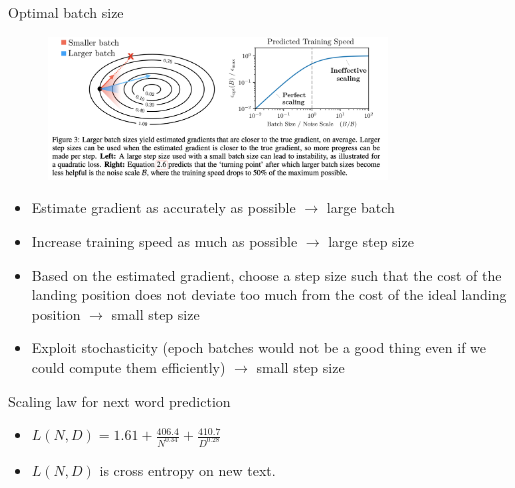 \begin{vbframe}{Optimal batch size}
\href{https://arxiv.org/pdf/1812.06162.pdf}{} 


\vfill

\begin{figure}
	\centering
	\includegraphics[width =9cm]{./figure/optimalbatchsize}
\end{figure}

\vfill

\begin{itemize}

	\item Estimate gradient as accurately as possible
        $\rightarrow$ large batch
        \item Increase training speed as much as possible
        $\rightarrow$ large step size
        \item Based on the estimated gradient, choose a step
        size such that the cost of the landing position does not deviate
        too much from the cost of the ideal landing position
        $\rightarrow$ small step size
        \item Exploit stochasticity (epoch batches would not
        be a good thing even if we could compute them efficiently)
        $\rightarrow$ small step size

\end{itemize}


\vfill

\end{vbframe}



\begin{vbframe}{Scaling law for next word prediction}

\vfill

\begin{itemize}


\item $L(N,D) = 1.61 + \frac{406.4}{N^{0.34}}        + \frac{410.7}{D^{0.28}}$        

\item $L(N,D)$ is cross entropy on new text.
        
	\end{itemize}


\vskip3mm


\vfill

\end{vbframe}

